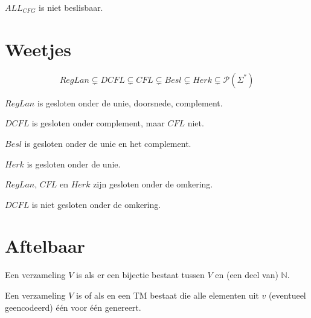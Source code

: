 \documentclass[main.tex]{subfiles}
\begin{document}
\begin{gev}
  $ALL_{CFG}$ is niet beslisbaar.
\end{gev}


\section{Weetjes}
\label{sec:weetjes}

\begin{st}
  \[ RegLan \subsetneq DCFL \subsetneq CFL \subsetneq Besl \subsetneq Herk \subsetneq \mathcal{P}(\Sigma^{*}) \]
\end{st}

\begin{st}
  $RegLan$ is gesloten onder de unie, doorsnede, complement.
\end{st}

\begin{st}
  $DCFL$ is gesloten onder complement, maar $CFL$ niet. 
\end{st}

\begin{st}
  $Besl$ is gesloten onder de unie en het complement.
\end{st}

\begin{st}
  $Herk$ is gesloten onder de unie.
\end{st}

\begin{st}
  $RegLan$, $CFL$ en $Herk$ zijn gesloten onder de omkering.
\end{st}

\begin{st}
  $DCFL$ is niet gesloten onder de omkering.
\end{st}

\section{Aftelbaar}
\label{sec:aftelbaar}

\begin{de}
  Een verzameling $V$ is  als er een bijectie bestaat tussen $V$ en (een deel van) $\mathbb{N}$.
\end{de}

\begin{de}
  Een verzameling $V$ is  of  als en een TM bestaat die alle elementen uit $v$ (eventueel geencodeerd) \'e\'en voor \'e\'en genereert.
\end{de}
\end{document}
